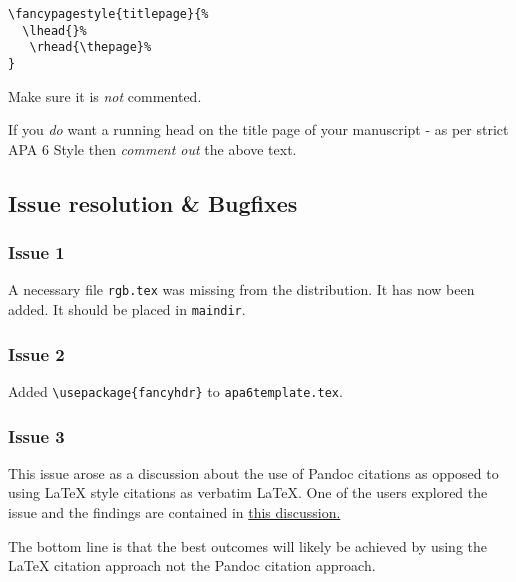 \begin{verbatim}
\fancypagestyle{titlepage}{%
  \lhead{}%
   \rhead{\thepage}%
}
\end{verbatim}

Make sure it is \emph{not} commented.

If you \emph{do} want a running head on the title page of your
manuscript - as per strict APA 6 Style then \emph{comment out} the above
text.

\subsection{Issue resolution \&
Bugfixes}\label{issue-resolution-bugfixes}

\subsubsection{Issue 1}\label{issue-1}

A necessary file \texttt{rgb.tex} was missing from the distribution. It
has now been added. It should be placed in \texttt{maindir}.

\subsubsection{Issue 2}\label{issue-2}

Added \texttt{\textbackslash{}usepackage\{fancyhdr\}} to
\texttt{apa6template.tex}.

\subsubsection{Issue 3}\label{issue-3}

This issue arose as a discussion about the use of Pandoc citations as
opposed to using LaTeX style citations as verbatim LaTeX. One of the
users explored the issue and the findings are contained in
\href{https://bitbucket.org/zuline/md2latex/issue/3/pandoc-citations-not-supported}{this
discussion.}

The bottom line is that the best outcomes will likely be achieved by
using the LaTeX citation approach not the Pandoc citation approach.
